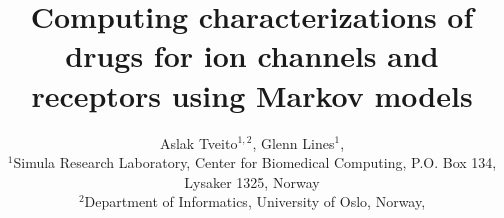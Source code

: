 \documentclass{book}
\renewcommand{\cite}[1]{\citep{#1}}
\begin{document}
\title{Computing characterizations of drugs for ion channels and receptors using Markov models}

\author{Aslak Tveito$^{1,2}$, Glenn Lines$^{1}$,
\\{\small{$^{1}$Simula Research Laboratory, Center for Biomedical Computing,
P.O. Box 134, Lysaker 1325, Norway}}
\\{\small{ $^{2}$Department of Informatics, University of Oslo, Norway,}}}
\maketitle





\bigskip
\tableofcontents












%
%


%


\end{document}
